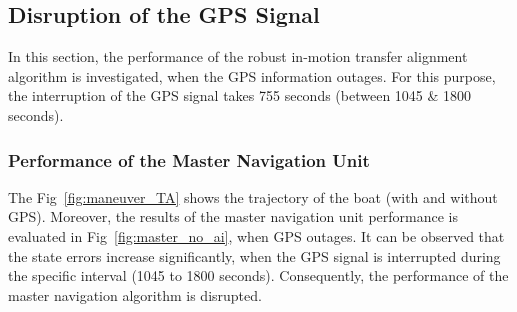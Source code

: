 \documentclass[3p]{elsarticle}
\begin{document}
\subsection{Disruption of the GPS Signal}\label{subsec:NN_no}
\noindent In this section, the performance of the robust in-motion transfer alignment algorithm is investigated, when the GPS information outages. For this purpose, the interruption of the GPS signal takes 755 seconds (between 1045 \& 1800 seconds).

\subsubsection{Performance of the Master Navigation Unit}
\noindent The Fig~\ref{fig:maneuver_TA} shows the trajectory of the boat (with and without GPS).
Moreover, the results of the master navigation unit performance is evaluated in Fig~\ref{fig:master_no_ai}, when GPS outages.
It can be observed that the state errors increase significantly, when the GPS signal is interrupted during the specific interval (1045 to 1800 seconds).
Consequently, the performance of the master navigation algorithm is disrupted.
\end{document}
